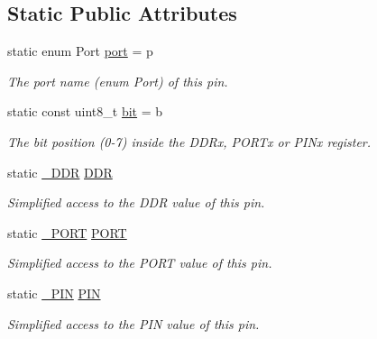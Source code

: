 \subsection*{Static Public Attributes}
\begin{DoxyCompactItemize}
\item 
static enum Port \hyperlink{structALIBVR__NAMESPACE__PORTS_1_1Pin_aea8553ad3a72b2ea72a5e94eabd06688}{port} = p\hypertarget{structALIBVR__NAMESPACE__PORTS_1_1Pin_aea8553ad3a72b2ea72a5e94eabd06688}{}\label{structALIBVR__NAMESPACE__PORTS_1_1Pin_aea8553ad3a72b2ea72a5e94eabd06688}

\begin{DoxyCompactList}\small\item\em The port name (enum Port) of this pin. \end{DoxyCompactList}\item 
static const uint8\+\_\+t \hyperlink{structALIBVR__NAMESPACE__PORTS_1_1Pin_a8d5732f8bfc0316fc2a77a899923fa87}{bit} = b\hypertarget{structALIBVR__NAMESPACE__PORTS_1_1Pin_a8d5732f8bfc0316fc2a77a899923fa87}{}\label{structALIBVR__NAMESPACE__PORTS_1_1Pin_a8d5732f8bfc0316fc2a77a899923fa87}

\begin{DoxyCompactList}\small\item\em The bit position (0-\/7) inside the D\+D\+Rx, P\+O\+R\+Tx or P\+I\+Nx register. \end{DoxyCompactList}\item 
static \hyperlink{structALIBVR__NAMESPACE__PORTS_1_1__Io}{\+\_\+\+D\+DR} \hyperlink{structALIBVR__NAMESPACE__PORTS_1_1Pin_a91515b99dfbd7423ffa4771ec32bfbe8}{D\+DR}
\begin{DoxyCompactList}\small\item\em Simplified access to the D\+DR value of this pin. \end{DoxyCompactList}\item 
static \hyperlink{structALIBVR__NAMESPACE__PORTS_1_1__Io}{\+\_\+\+P\+O\+RT} \hyperlink{structALIBVR__NAMESPACE__PORTS_1_1Pin_aaa60d0cc181d9170487e5429a3c63227}{P\+O\+RT}
\begin{DoxyCompactList}\small\item\em Simplified access to the P\+O\+RT value of this pin. \end{DoxyCompactList}\item 
static \hyperlink{structALIBVR__NAMESPACE__PORTS_1_1__Io}{\+\_\+\+P\+IN} \hyperlink{structALIBVR__NAMESPACE__PORTS_1_1Pin_a1db5d20ab305dba1701558e8fd2b94a7}{P\+IN}
\begin{DoxyCompactList}\small\item\em Simplified access to the P\+IN value of this pin. \end{DoxyCompactList}\end{DoxyCompactItemize}


